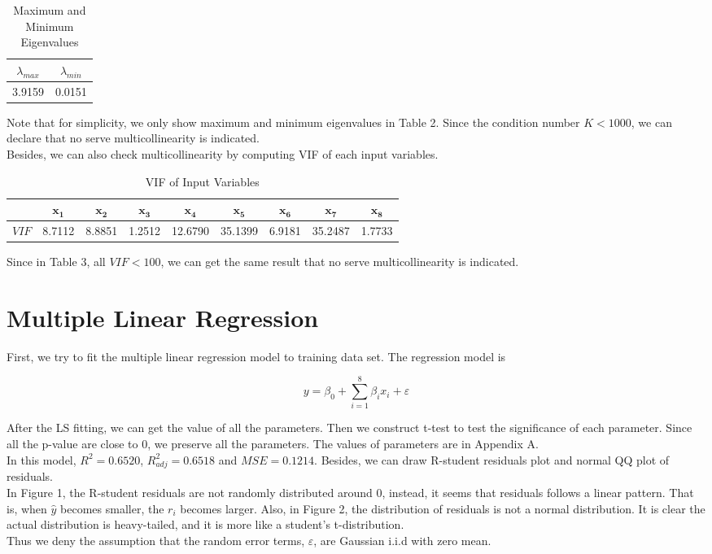 \documentclass[12pt,a4paper]{article}
\begin{document}
\begin{table}[h]
	\centering
	\begin{tabular}{cc}
		\hline
	    $\lambda_{max}$ & $\lambda_{min}$ \\
		\hline
		3.9159 & 0.0151\\
		\hline
	\end{tabular}
	\caption{Maximum and Minimum Eigenvalues}\label{Table:2}
\end{table}
Note that for simplicity, we only show maximum and minimum eigenvalues in Table 2. Since the condition number $K<1000$, we can declare that no serve multicollinearity is indicated.\\
\indent Besides, we can also check multicollinearity by computing VIF of each input variables.

\begin{table}[h]
	\centering
	\begin{tabular}{ccccccccc}
		\hline
		& $\bm{x_{1}}$ & $\bm{x_{2}}$ & $\bm{x_{3}}$ & $\bm{x_{4}}$ & $\bm{x_{5}}$ & $\bm{x_{6}}$ & $\bm{x_{7}} $ & $\bm{x_{8}}$ \\
		\hline
		$VIF$ & 8.7112 & 8.8851 & 1.2512 & 12.6790 & 35.1399 & 6.9181 & 35.2487 & 1.7733\\
		\hline
	\end{tabular}
	\caption{VIF of Input Variables}
\end{table}
Since in Table 3, all $VIF<100$, we can get the same result that no serve multicollinearity is indicated.

\section{Multiple Linear Regression}
\qquad First, we try to fit the multiple linear regression model to training data set. The regression model is 

\begin{equation}
y = \beta_{0}+\sum_{i=1}^{8}\beta_{i}x_{i}+\varepsilon
\end{equation}

\indent After the LS fitting, we can get the value of all the parameters. Then we construct t-test to test the significance of each parameter. Since all the p-value are close to $0$, we preserve all the parameters. The values of parameters are in Appendix A.\\ 
\indent In this model, $R^{2}=0.6520$, $R^{2}_{adj}=0.6518$ and $MSE=0.1214$. Besides, we can draw R-student residuals plot and normal QQ plot of residuals.\\
\indent In Figure 1, the R-student residuals are not randomly distributed around 0, instead, it seems that residuals follows a linear pattern. That is, when $\hat{y}$ becomes smaller, the $r_{i}$ becomes larger. Also, in Figure 2, the distribution of residuals is not a normal distribution. It is clear the actual distribution is heavy-tailed, and it is more like a student's t-distribution.\\
\indent Thus we deny the assumption that the random error terms, $\varepsilon$, are Gaussian i.i.d with zero mean.
\end{document}
